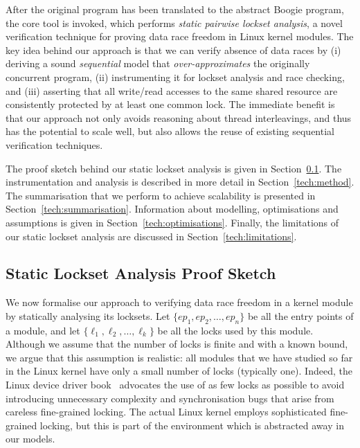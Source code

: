 After the original program has been translated to the abstract Boogie program, the core \whoop tool is invoked, which performs \emph{static pairwise lockset analysis}, a novel verification technique for proving data race freedom in Linux kernel modules. The key idea behind our approach is that we can verify absence of data races by (i) deriving a sound \emph{sequential} model that \emph{over-approximates} the originally concurrent program, (ii) instrumenting it for lockset analysis and race checking, and (iii) asserting that all write/read accesses to the same shared resource are consistently protected by at least one common lock. The immediate benefit is that our approach not only avoids reasoning about thread interleavings, and thus has the potential to scale well, but also allows the reuse of existing sequential verification techniques.

The proof sketch behind our static lockset analysis is given in Section~\ref{tech:proof}. The instrumentation and analysis is described in more detail in Section~\ref{tech:method}. The summarisation that we perform to achieve scalability is presented in Section~\ref{tech:summarisation}. 
Information about modelling, optimisations and assumptions is given in Section~\ref{tech:optimisations}. Finally, the limitations of our static lockset analysis are discussed in Section~\ref{tech:limitations}.

\subsection{Static Lockset Analysis Proof Sketch}
\label{tech:proof}

We now formalise our approach to verifying data race freedom in a kernel module by statically analysing its locksets. Let $\{\mathit{ep}_{1}, \mathit{ep}_{2}, \dotsc, \mathit{ep}_{n}\}$ be all the entry points of a module, and let $\{\ell_{1}, \ell_{2}, \dotsc, \ell_{k}\}$ be all the locks used by this module. Although we assume that the number of locks is finite and with a known bound, we argue that this assumption is realistic: all modules that we have studied so far in the Linux kernel have only a small number of locks (typically one). Indeed, the Linux device driver book~\cite{corbet2005linux} advocates the use of as few locks as possible to avoid introducing unnecessary complexity and synchronisation bugs that arise from careless fine-grained locking. The actual Linux kernel employs sophisticated fine-grained locking, but this is part of the environment which is abstracted away in our models.

